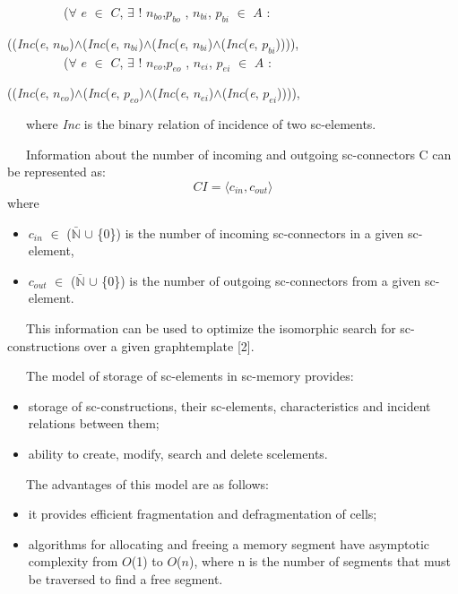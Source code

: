 \documentclass[10pt, a4paper, twocolumn]{article}
\begin{document}
\ \ \ \ \ \ \ \ \ ($\forall$ $e$ $\in$ $C$, $\exists$ ! $n_{bo}$,$p_{bo}$ , $n_{bi}$, $p_{bi}$ $\in$ $A$ : \par
((\textit{Inc}(\textit{e}, $n_{bo}$)$\wedge$(\textit{Inc}(\textit{e}, $n_{bi}$)$\wedge$(\textit{Inc}(\textit{e}, $n_{bi}$)$\wedge$(\textit{Inc}(\textit{e}, $p_{bi}$)))),
\\ 

\ \ \ \ \ \ \ \ \ ($\forall$ $e$ $\in$ $C$, $\exists$ ! $n_{eo}$,$p_{eo}$ , $n_{ei}$, $p_{ei}$ $\in$ $A$ : \par
((\textit{Inc}(\textit{e}, $n_{eo}$)$\wedge$(\textit{Inc}(\textit{e}, $p_{eo}$)$\wedge$(\textit{Inc}(\textit{e}, $n_{ei}$)$\wedge$(\textit{Inc}(\textit{e}, $p_{ei}$)))),
\par \ \ \ where \textit{Inc} is the binary relation of incidence of two
sc-elements.
\par \ \ \ Information about the number of incoming and outgoing sc-connectors C can be represented as:
\[
CI = \langle c_{in}, c_{out} \rangle 
\]
where
\begin{itemize}[noitemsep,topsep=0pt,parsep=0pt,partopsep=0pt]
    \item $c_{in}$ $\in$ ($\mathbb{\bar N}$ $\cup$ \{0\}) is the number of incoming sc-connectors in a given sc-element,
    \item $c_{out}$ $\in$ ($\mathbb{\bar N}$ $\cup$ \{0\}) is the number of outgoing sc-connectors from a given sc-element.
\end{itemize}
\par \ \ \ This information can be used to optimize the isomorphic search for sc-constructions over a given graphtemplate [2].
\par \ \ \ The model of storage of sc-elements in sc-memory
provides:
\begin{itemize}[noitemsep,topsep=0pt,parsep=0pt,partopsep=0pt]
    \item  storage of sc-constructions, their sc-elements, characteristics and incident relations between them;
    \item ability to create, modify, search and delete scelements.
\end{itemize}
\par \ \ \ The advantages of this model are as follows:
\begin{itemize}[noitemsep,topsep=0pt,parsep=0pt,partopsep=0pt]
    \item it provides efficient fragmentation and defragmentation of cells;
    \item algorithms for allocating and freeing a memory
segment have asymptotic complexity from $O$(1) to
$O$($n$), where n is the number of segments that must
be traversed to find a free segment.
\end{itemize}
\end{document}
